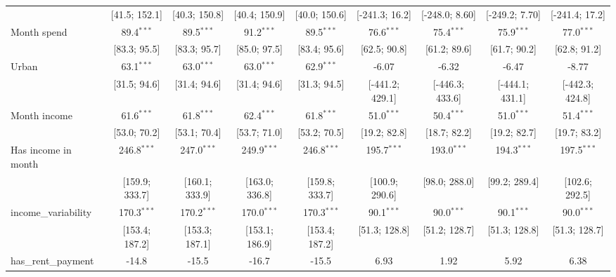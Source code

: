 \begin{table}[htbp]
\begin{threeparttable}[b]
\begin{tabular}{lcccccccc}
                                  & [41.5; 152.1]   & [40.3; 150.8]   & [40.4; 150.9]   & [40.0; 150.6]   & [-241.3; 16.2]  & [-248.0; 8.60]  & [-249.2; 7.70]  & [-241.4; 17.2]\\   
         Month spend              & 89.4$^{***}$    & 89.5$^{***}$    & 91.2$^{***}$    & 89.5$^{***}$    & 76.6$^{***}$    & 75.4$^{***}$    & 75.9$^{***}$    & 77.0$^{***}$\\   
                                  & [83.3; 95.5]    & [83.3; 95.7]    & [85.0; 97.5]    & [83.4; 95.6]    & [62.5; 90.8]    & [61.2; 89.6]    & [61.7; 90.2]    & [62.8; 91.2]\\   
         Urban                    & 63.1$^{***}$    & 63.0$^{***}$    & 63.0$^{***}$    & 62.9$^{***}$    & -6.07           & -6.32           & -6.47           & -8.77\\   
                                  & [31.5; 94.6]    & [31.4; 94.6]    & [31.4; 94.6]    & [31.3; 94.5]    & [-441.2; 429.1] & [-446.3; 433.6] & [-444.1; 431.1] & [-442.3; 424.8]\\   
         Month income             & 61.6$^{***}$    & 61.8$^{***}$    & 62.4$^{***}$    & 61.8$^{***}$    & 51.0$^{***}$    & 50.4$^{***}$    & 51.0$^{***}$    & 51.4$^{***}$\\   
                                  & [53.0; 70.2]    & [53.1; 70.4]    & [53.7; 71.0]    & [53.2; 70.5]    & [19.2; 82.8]    & [18.7; 82.2]    & [19.2; 82.7]    & [19.7; 83.2]\\   
         Has income in month      & 246.8$^{***}$   & 247.0$^{***}$   & 249.9$^{***}$   & 246.8$^{***}$   & 195.7$^{***}$   & 193.0$^{***}$   & 194.3$^{***}$   & 197.5$^{***}$\\   
                                  & [159.9; 333.7]  & [160.1; 333.9]  & [163.0; 336.8]  & [159.8; 333.7]  & [100.9; 290.6]  & [98.0; 288.0]   & [99.2; 289.4]   & [102.6; 292.5]\\   
         income\_variability      & 170.3$^{***}$   & 170.2$^{***}$   & 170.0$^{***}$   & 170.3$^{***}$   & 90.1$^{***}$    & 90.0$^{***}$    & 90.1$^{***}$    & 90.0$^{***}$\\   
                                  & [153.4; 187.2]  & [153.3; 187.1]  & [153.1; 186.9]  & [153.4; 187.2]  & [51.3; 128.8]   & [51.2; 128.7]   & [51.3; 128.8]   & [51.3; 128.7]\\   
         has\_rent\_payment       & -14.8           & -15.5           & -16.7           & -15.5           & 6.93            & 1.92            & 5.92            & 6.38\\   

\end{tabular}
\end{threeparttable}
\end{table}

